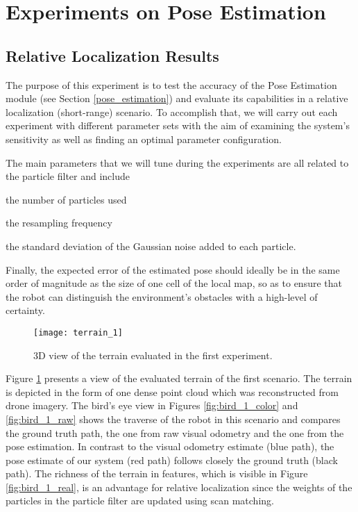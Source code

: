 \section{Experiments on Pose Estimation}

\subsection{Relative Localization Results}

The purpose of this experiment is to test the accuracy of the Pose Estimation
module (see Section \ref{pose_estimation}) and evaluate its capabilities
in a relative localization (short-range) scenario.
To accomplish that, we will carry out each experiment with different parameter
sets with the aim of examining the system's sensitivity as well as finding an
optimal parameter configuration.

The main parameters that we will tune during the experiments are all related
to the particle filter and include
\begin{enumerate*}[label=(\roman*)]
        \item the number of particles used
        \item the resampling frequency
        \item the standard deviation of the Gaussian noise
            added to each particle.
\end{enumerate*}
Finally, the expected error of the estimated pose should ideally be in the
same order of magnitude as the size of one cell of the local map, so as to
ensure that the robot can distinguish the environment's obstacles with
a high-level of certainty.

\begin{figure}[h!]
    \centering
    \texttt{[image: terrain\_1]}
    \caption[Terrain of first experiment]{
        3D view of the terrain evaluated in the first experiment.
    }
    \label{fig:terrain_1}
\end{figure}

Figure \ref{fig:terrain_1} presents a view of the evaluated terrain of the
first scenario.
The terrain is depicted in the form of one dense point cloud which was
reconstructed from drone imagery.
The bird's eye view in Figures \ref{fig:bird_1_color} and \ref{fig:bird_1_raw}
shows the traverse of the robot in this scenario and compares the ground truth
path, the one from raw visual odometry and the one from the pose estimation.
In contrast to the visual odometry estimate (blue path), the pose estimate
of our system (red path) follows closely the ground truth (black path).
The richness of the terrain in features, which is visible in Figure
\ref{fig:bird_1_real}, is an advantage for relative localization since
the weights of the particles in the particle filter are updated using
scan matching.

